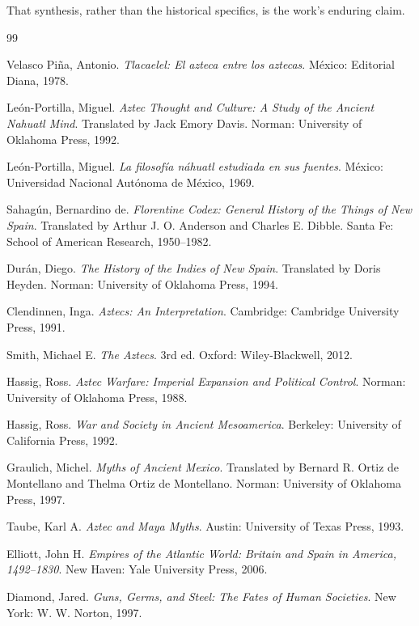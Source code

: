 \documentclass[12pt]{article}
\begin{document}
That synthesis, rather than the historical specifics, is the work's enduring claim.

\newpage
\begin{thebibliography}{99}

Velasco Piña, Antonio.
\textit{Tlacaelel: El azteca entre los aztecas}.
México: Editorial Diana, 1978.

León-Portilla, Miguel.
\textit{Aztec Thought and Culture: A Study of the Ancient Nahuatl Mind}.
Translated by Jack Emory Davis.
Norman: University of Oklahoma Press, 1992.

León-Portilla, Miguel.
\textit{La filosofía náhuatl estudiada en sus fuentes}.
México: Universidad Nacional Autónoma de México, 1969.

Sahagún, Bernardino de.
\textit{Florentine Codex: General History of the Things of New Spain}.
Translated by Arthur J. O. Anderson and Charles E. Dibble.
Santa Fe: School of American Research, 1950--1982.

Durán, Diego.
\textit{The History of the Indies of New Spain}.
Translated by Doris Heyden.
Norman: University of Oklahoma Press, 1994.

Clendinnen, Inga.
\textit{Aztecs: An Interpretation}.
Cambridge: Cambridge University Press, 1991.

Smith, Michael E.
\textit{The Aztecs}.
3rd ed.
Oxford: Wiley-Blackwell, 2012.

Hassig, Ross.
\textit{Aztec Warfare: Imperial Expansion and Political Control}.
Norman: University of Oklahoma Press, 1988.

Hassig, Ross.
\textit{War and Society in Ancient Mesoamerica}.
Berkeley: University of California Press, 1992.

Graulich, Michel.
\textit{Myths of Ancient Mexico}.
Translated by Bernard R. Ortiz de Montellano and Thelma Ortiz de Montellano.
Norman: University of Oklahoma Press, 1997.

Taube, Karl A.
\textit{Aztec and Maya Myths}.
Austin: University of Texas Press, 1993.

Elliott, John H.
\textit{Empires of the Atlantic World: Britain and Spain in America, 1492--1830}.
New Haven: Yale University Press, 2006.

Diamond, Jared.
\textit{Guns, Germs, and Steel: The Fates of Human Societies}.
New York: W. W. Norton, 1997.


\end{thebibliography}
\end{document}
